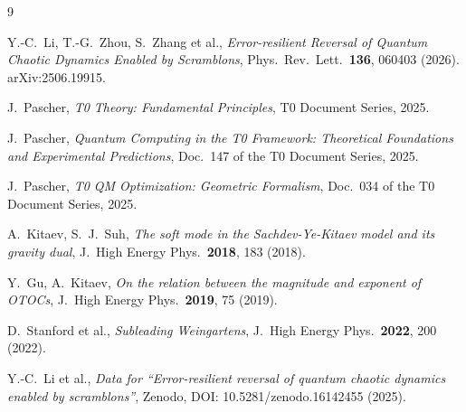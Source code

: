\begin{thebibliography}{9}

Y.-C.~Li, T.-G.~Zhou, S.~Zhang et al.,
\textit{Error-resilient Reversal of Quantum Chaotic Dynamics Enabled by Scramblons},
Phys.\ Rev.\ Lett.\ \textbf{136}, 060403 (2026).
arXiv:2506.19915.

J.~Pascher,
\textit{T0 Theory: Fundamental Principles},
T0 Document Series, 2025.

J.~Pascher,
\textit{Quantum Computing in the T0 Framework: Theoretical Foundations and Experimental Predictions},
Doc.~147 of the T0 Document Series, 2025.

J.~Pascher,
\textit{T0 QM Optimization: Geometric Formalism},
Doc.~034 of the T0 Document Series, 2025.

A.~Kitaev, S.~J.~Suh,
\textit{The soft mode in the Sachdev-Ye-Kitaev model and its gravity dual},
J.\ High Energy Phys.\ \textbf{2018}, 183 (2018).

Y.~Gu, A.~Kitaev,
\textit{On the relation between the magnitude and exponent of OTOCs},
J.\ High Energy Phys.\ \textbf{2019}, 75 (2019).

D.~Stanford et al.,
\textit{Subleading Weingartens},
J.\ High Energy Phys.\ \textbf{2022}, 200 (2022).

Y.-C.~Li et al.,
\textit{Data for ``Error-resilient reversal of quantum chaotic dynamics enabled by scramblons''},
Zenodo, DOI: 10.5281/zenodo.16142455 (2025).

\end{thebibliography}
